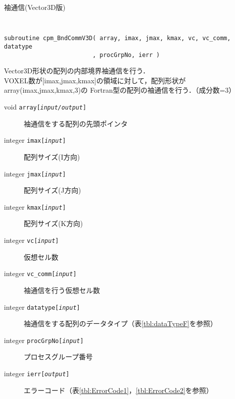 \begin{spacing}{0.8}
\begin{itembox}[l]{袖通信(Vector3D版)}
{\tt
\begin{verbatim}
subroutine cpm_BndCommV3D( array, imax, jmax, kmax, vc, vc_comm, datatype
                         , procGrpNo, ierr )
\end{verbatim}
}
Vector3D形状の配列の内部境界袖通信を行う．\\
VOXEL数が[imax,jmax,kmax]の領域に対して，配列形状がarray(imax,jmax,kmax,3)の
Fortran型の配列の袖通信を行う．（成分数=3）
\begin{description}
\item[void    {\tt array[{\it input/output}]}] 袖通信をする配列の先頭ポインタ
\item[integer {\tt imax[{\it input}]}] 配列サイズ(I方向)
\item[integer {\tt jmax[{\it input}]}] 配列サイズ(J方向)
\item[integer {\tt kmax[{\it input}]}] 配列サイズ(K方向)
\item[integer {\tt vc[{\it input}]}] 仮想セル数
\item[integer {\tt vc\_comm[{\it input}]}] 袖通信を行う仮想セル数
\item[integer {\tt datatype[{\it input}]}] 袖通信をする配列のデータタイプ（表\ref{tbl:dataTypeF}を参照）
\item[integer {\tt procGrpNo[{\it input}]}] プロセスグループ番号
\item[integer {\tt ierr[{\it output}]}] エラーコード（表\ref{tbl:ErrorCode1}，\ref{tbl:ErrorCode2}を参照）
\end{description}
\end{itembox}\\
\end{spacing}

